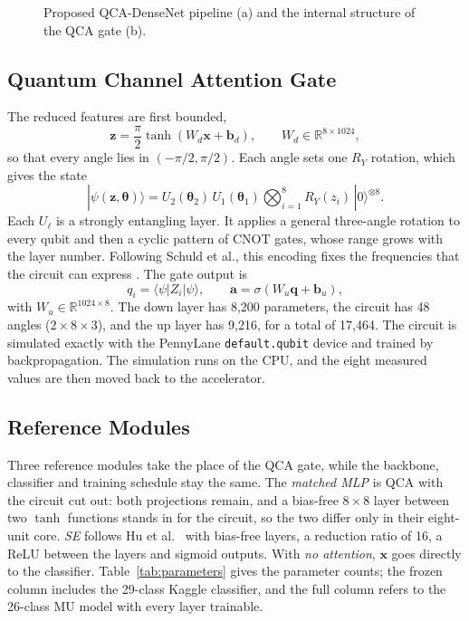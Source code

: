 \documentclass[10pt,twocolumn]{article}
\newcommand{\QCA}{QCA}
\newcommand{\vect}[1]{\mathbf{#1}}
\begin{document}
\begin{figure}[!t]
\centering
\resizebox{0.97\textwidth}{!}{}
\caption{Proposed QCA-DenseNet pipeline (a) and the internal structure of the QCA gate (b).}
\label{fig:pipeline}
\end{figure}

\subsection{Quantum Channel Attention Gate}

The reduced features are first bounded,
\begin{equation}
  \vect{z} = \frac{\pi}{2}\tanh\!\left(W_d\vect{x}+\vect{b}_d\right),
  \qquad W_d\in\mathbb{R}^{8\times1024},
  \label{eq:encode}
\end{equation}
so that every angle lies in $(-\pi/2,\pi/2)$. Each angle sets one $R_Y$
rotation, which gives the state
\begin{equation}
  |\psi(\vect{z},\boldsymbol{\theta})\rangle =
  U_2(\boldsymbol{\theta}_2)\,U_1(\boldsymbol{\theta}_1)
  \bigotimes_{i=1}^{8} R_Y(z_i)\,|0\rangle^{\otimes 8}.
  \label{eq:state}
\end{equation}
Each $U_\ell$ is a strongly entangling layer. It applies a general
three-angle rotation to every qubit and then a cyclic pattern of CNOT gates,
whose range grows with the layer number. Following Schuld et al., this
encoding fixes the frequencies that the circuit can express
\citep{schuld_2021_encoding}. The gate output is
\begin{equation}
  q_i = \langle\psi|Z_i|\psi\rangle,\qquad
  \vect{a} = \sigma\!\left(W_u\vect{q}+\vect{b}_u\right),
  \label{eq:gate}
\end{equation}
with $W_u\in\mathbb{R}^{1024\times8}$. The down layer has 8,200 parameters,
the circuit has 48 angles ($2\times8\times3$), and the up layer has 9,216,
for a total of 17,464. The circuit is simulated exactly with the PennyLane
\texttt{default.qubit} device and trained by backpropagation. The simulation
runs on the CPU, and the eight measured values are then moved back to the
accelerator.

\subsection{Reference Modules}

Three reference modules take the place of the \QCA{} gate, while the
backbone, classifier and training schedule stay the same. The \emph{matched
MLP} is \QCA{} with the circuit cut out: both projections remain, and a
bias-free $8\times8$ layer between two $\tanh$ functions stands in for the
circuit, so the two differ only in their eight-unit core. \emph{SE} follows
Hu et al.\ \citep{hu_2020_se} with bias-free layers, a reduction ratio of
16, a ReLU between the layers and sigmoid outputs. With \emph{no attention},
$\vect{x}$ goes directly to the classifier. Table~\ref{tab:parameters}
gives the parameter counts; the frozen column includes the 29-class Kaggle
classifier, and the full column refers to the 26-class MU model with every
layer trainable.
\end{document}
